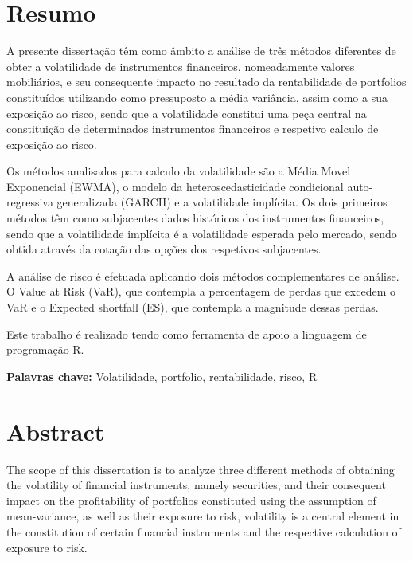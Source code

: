 \documentclass[
  12pt,
  brazil,
  a4paper,
  openany]{book}
\begin{document}
\clearpage

\chapter*{Resumo}
\fontsize{12}{21}\selectfont
A presente dissertação têm como âmbito a análise de três métodos diferentes de obter a volatilidade de instrumentos financeiros, nomeadamente valores mobiliários, e seu consequente impacto no resultado da rentabilidade de portfolios constituídos utilizando como pressuposto a média variância, assim como a sua exposição ao risco, sendo que a volatilidade constitui uma peça central na constituição de determinados instrumentos financeiros e respetivo calculo de exposição ao risco.

Os métodos analisados para calculo da volatilidade são a Média Movel Exponencial (EWMA), o modelo da heteroscedasticidade condicional auto-regressiva generalizada (GARCH) e a volatilidade implícita. Os dois primeiros métodos têm como subjacentes dados históricos dos instrumentos financeiros, sendo que a volatilidade implícita é a volatilidade esperada pelo mercado, sendo obtida através da cotação das opções dos respetivos subjacentes.

A análise de risco é efetuada aplicando dois métodos complementares de análise. O Value at Risk (VaR), que contempla a percentagem de perdas que excedem o VaR e o Expected shortfall (ES), que contempla a magnitude dessas perdas.

Este trabalho é realizado tendo como ferramenta de apoio a linguagem de programação R.
\bigbreak

\noindent\textbf{Palavras chave:} Volatilidade, portfolio, rentabilidade, risco, R




\setcounter{page}{2}

\chapter*{Abstract}
\fontsize{12}{21}\selectfont
The scope of this dissertation is to analyze three different methods of obtaining the volatility of financial instruments, namely securities, and their consequent impact on the profitability of portfolios constituted using the assumption of mean-variance, as well as their exposure to risk, volatility is a central element in the constitution of certain financial instruments and the respective calculation of exposure to risk.
\end{document}
